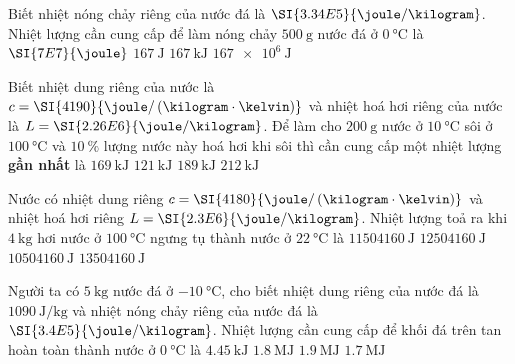 \begin{ex}
	Biết nhiệt nóng chảy riêng của nước đá là $\SI{3.34E5}{\joule/\kilogram}$. Nhiệt lượng cần cung cấp để làm nóng chảy $\SI{500}{\gram}$ nước đá ở $\SI{0}{\celsius}$ là
	\choice
	{$\SI{7E7}{\joule}$}
	{$\SI{167}{\joule}$}
	{\True $\SI{167}{\kilo\joule}$}
	{$\SI{167e6}{\joule}$}
\end{ex}
\begin{ex}
	Biết nhiệt dung riêng của nước là $c=\SI{4190}{\joule/\left(\kilogram\cdot\kelvin\right)}$ và nhiệt hoá hơi riêng của nước là $L=\SI{2.26E6}{\joule/\kilogram}$. Để làm cho $\SI{200}{\gram}$ nước ở $\SI{10}{\celsius}$ sôi ở $\SI{100}{\celsius}$ và $\SI{10}{\percent}$ lượng nước này hoá hơi khi sôi thì cần cung cấp một nhiệt lượng \textbf{gần nhất} là
	\choice
	{$\SI{169}{\kilo\joule}$}
	{\True $\SI{121}{\kilo\joule}$}
	{$\SI{189}{\kilo\joule}$}
	{$\SI{212}{\kilo\joule}$}
\end{ex}
\begin{ex}
	Nước có nhiệt dung riêng $c=\SI{4180}{\joule/\left(\kilogram\cdot\kelvin\right)}$ và nhiệt hoá hơi riêng $L=\SI{2.3E6}{\joule/\kilogram}$. Nhiệt lượng toả ra khi $\SI{4}{\kilogram}$ hơi nước ở $\SI{100}{\celsius}$ ngưng tụ thành nước ở $\SI{22}{\celsius}$ là 
	\choice
	{$\SI{11504160}{\joule}$}
	{$\SI{12504160}{\joule}$}
	{\True $\SI{10504160}{\joule}$}
	{$\SI{13504160}{\joule}$}
\end{ex}
\begin{ex}
	Người ta có $\SI{5}{\kilogram}$ nước đá ở $\SI{-10}{\celsius}$, cho biết nhiệt dung riêng của nước đá là $\SI{1090}{\joule/\kilogram}$ và nhiệt nóng chảy riêng của nước đá là $\SI{3.4E5}{\joule/\kilogram}$. Nhiệt lượng cần cung cấp để khối đá trên tan hoàn toàn thành nước ở $\SI{0}{\celsius}$ là
	\choice
	{$\SI{4.45}{\kilo\joule}$}
	{\True $\SI{1.8}{\mega\joule}$}
	{$\SI{1.9}{\mega\joule}$}
	{$\SI{1.7}{\mega\joule}$}
\end{ex}

